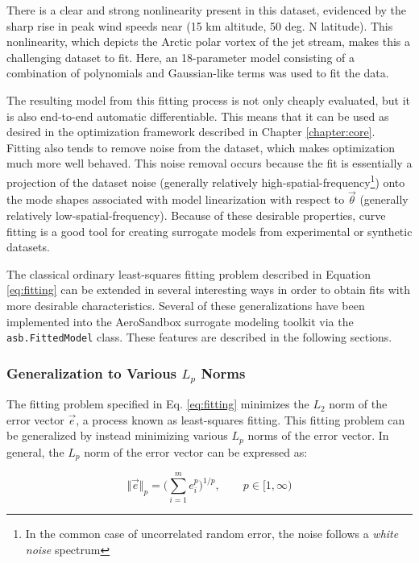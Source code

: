 There is a clear and strong nonlinearity present in this dataset, evidenced by the sharp rise in peak wind speeds near (15 km altitude, 50 deg. N latitude). This nonlinearity, which depicts the Arctic polar vortex of the jet stream, makes this a challenging dataset to fit. Here, an 18-parameter model consisting of a combination of polynomials and Gaussian-like terms was used to fit the data.

The resulting model from this fitting process is not only cheaply evaluated, but it is also end-to-end automatic differentiable. This means that it can be used as desired in the optimization framework described in Chapter \ref{chapter:core}. Fitting also tends to remove noise from the dataset, which makes optimization much more well behaved. This noise removal occurs because the fit is essentially a projection of the dataset noise (generally relatively high-spatial-frequency\footnote{In the common case of uncorrelated random error, the noise follows a \textit{white noise} spectrum}) onto the mode shapes associated with model linearization with respect to $\vec{\theta}$ (generally relatively low-spatial-frequency). Because of these desirable properties, curve fitting is a good tool for creating surrogate models from experimental or synthetic datasets.

The classical ordinary least-squares fitting problem described in Equation \ref{eq:fitting} can be extended in several interesting ways in order to obtain fits with more desirable characteristics. Several of these generalizations have been implemented into the AeroSandbox surrogate modeling toolkit via the \texttt{asb.FittedModel} class. These features are described in the following sections.

\subsubsection{Generalization to Various $L_p$ Norms}

The fitting problem specified in Eq. \ref{eq:fitting} minimizes the $L_2$ norm of the error vector $\vec{e}$, a process known as least-squares fitting. This fitting problem can be generalized by instead minimizing various $L_p$ norms of the error vector. In general, the $L_p$ norm of the error vector can be expressed as:

\begin{equation}
    \big\Vert \vec{e} \big\Vert _p = \bigg( \sum_{i=1}^m e_i^p \bigg)^{1/p}, \qquad p \in [1, \infty)
    \label{eq:norms}
\end{equation}

